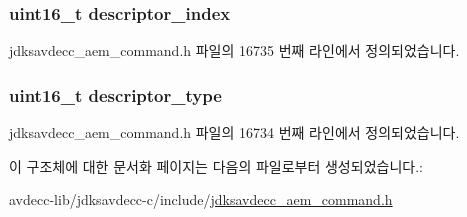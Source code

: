 \subsubsection[{\texorpdfstring{descriptor\+\_\+index}{descriptor_index}}]{\setlength{\rightskip}{0pt plus 5cm}uint16\+\_\+t descriptor\+\_\+index}\hypertarget{structjdksavdecc__aem__command__set__control_a042bbc76d835b82d27c1932431ee38d4}{}\label{structjdksavdecc__aem__command__set__control_a042bbc76d835b82d27c1932431ee38d4}


jdksavdecc\+\_\+aem\+\_\+command.\+h 파일의 16735 번째 라인에서 정의되었습니다.

\subsubsection[{\texorpdfstring{descriptor\+\_\+type}{descriptor_type}}]{\setlength{\rightskip}{0pt plus 5cm}uint16\+\_\+t descriptor\+\_\+type}\hypertarget{structjdksavdecc__aem__command__set__control_ab7c32b6c7131c13d4ea3b7ee2f09b78d}{}\label{structjdksavdecc__aem__command__set__control_ab7c32b6c7131c13d4ea3b7ee2f09b78d}


jdksavdecc\+\_\+aem\+\_\+command.\+h 파일의 16734 번째 라인에서 정의되었습니다.



이 구조체에 대한 문서화 페이지는 다음의 파일로부터 생성되었습니다.\+:\begin{DoxyCompactItemize}
\item 
avdecc-\/lib/jdksavdecc-\/c/include/\hyperlink{jdksavdecc__aem__command_8h}{jdksavdecc\+\_\+aem\+\_\+command.\+h}\end{DoxyCompactItemize}
